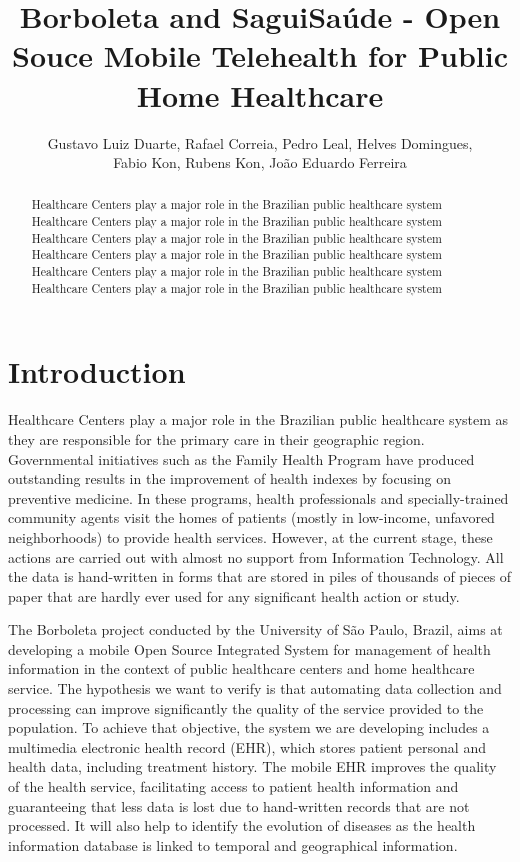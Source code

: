 \documentclass[12pt]{article}
\title{Borboleta and SaguiSaúde - Open Souce Mobile Telehealth for Public Home Healthcare}
\author{Gustavo Luiz Duarte, Rafael Correia, Pedro Leal, Helves Domingues, \\
		Fabio Kon, Rubens Kon, João Eduardo Ferreira}
\begin{document}
\maketitle

\begin{abstract}
   	Healthcare Centers play a major role in the Brazilian public healthcare system
	Healthcare Centers play a major role in the Brazilian public healthcare system
	Healthcare Centers play a major role in the Brazilian public healthcare system
	Healthcare Centers play a major role in the Brazilian public healthcare system
	Healthcare Centers play a major role in the Brazilian public healthcare system
	Healthcare Centers play a major role in the Brazilian public healthcare system
\end{abstract}

\section{Introduction}

Healthcare Centers play a major role in the Brazilian public healthcare system
as they are responsible for the primary care in their geographic region.
Governmental initiatives such as the Family Health Program have produced outstanding
results in the improvement of health indexes by focusing on preventive medicine. In
these programs, health professionals and specially-trained community agents visit
the homes of patients (mostly in low-income, unfavored neighborhoods) to provide
health services. However, at the current stage, these actions are carried out with
almost no support from Information Technology. All the data is hand-written in forms
that are stored in piles of thousands of pieces of paper that are hardly ever used for any
significant health action or study.

The Borboleta project conducted by the University of São Paulo, Brazil, aims at developing
a mobile Open Source Integrated System for management of health information in the context
of public healthcare centers and home healthcare service. The hypothesis we want to verify
is that automating data collection and processing can improve significantly the quality
of the service provided to the population. To achieve that objective, the system we are
developing includes a multimedia electronic health record (EHR), which stores patient personal
and health data, including treatment history. The mobile EHR improves the quality of the health
service, facilitating access to patient health information and guaranteeing that less data is lost due
to hand-written records that are not processed. It will also help to identify the evolution of diseases
as the health information database is linked to temporal and geographical information.
\end{document}

